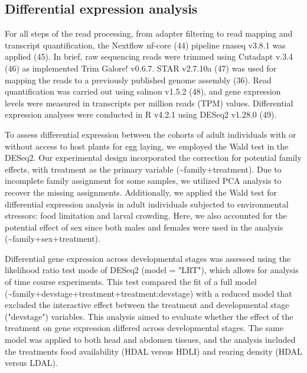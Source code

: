 \documentclass[lineno]{wiley-article}
\begin{document}
\subsection{Differential expression analysis}
For all steps of the read processing, from adapter filtering to read mapping and transcript quantification, the Nextflow nf-core (44) pipeline rnaseq v3.8.1 was applied (45). In brief, raw sequencing reads were trimmed using Cutadapt v.3.4 (46) as implemented Trim Galore! v0.6.7. STAR v2.7.10a (47) was used for mapping the reads to a previously published genome assembly (36). Read quantification was carried out using salmon v1.5.2 (48), and gene expression levels were measured in transcripts per million reads (TPM) values. Differential expression analyses were conducted in R v4.2.1 using DESeq2 v1.28.0 (49).

To assess differential expression between the cohorts of adult individuals with or without access to host plants for egg laying, we employed the Wald test in the DESeq2. Our experimental design incorporated the correction for potential family effects, with treatment as the primary variable (\textasciitilde family+treatment). Due to incomplete family assignment for some samples, we utilized PCA analysis to recover the missing assignments. Additionally, we applied the Wald test for differential expression analysis in adult individuals subjected to environmental stressors: food limitation and larval crowding. Here, we also accounted for the potential effect of sex since both males and females were used in the analysis (\textasciitilde family+sex+treatment).

Differential gene expression across developmental stages was assessed using the likelihood ratio test mode of DESeq2 (model = "LRT"), which allows for analysis of time course experiments. This test compared the fit of a full model (\textasciitilde family+devstage+treatment+treatment:devstage) with a reduced model that excluded the interactive effect between the treatment and developmental stage ("devstage") variables. This analysis aimed to evaluate whether the effect of the treatment on gene expression differed across developmental stages. The same model was applied to both head and abdomen tissues, and the analysis included the treatments food availability (HDAL versus HDLI) and rearing density (HDAL versus LDAL).
\end{document}
